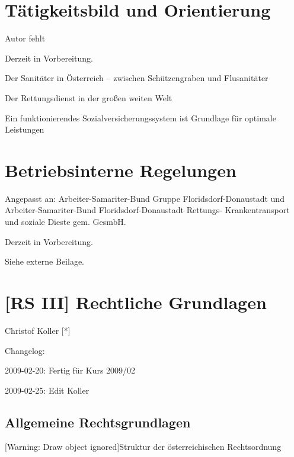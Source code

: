 \documentclass{article}
\begin{document}
\section{T\"atigkeitsbild und Orientierung}
Autor fehlt

Derzeit in Vorbereitung.

Der Sanit\"ater in \"Osterreich -- zwischen Sch\"utzengraben und
Flusanit\"ater

Der Rettungsdienst in der gro{\ss}en weiten Welt 

Ein funktionierendes Sozialversicherungssystem ist Grundlage f\"ur
optimale Leistungen

\section{Betriebsinterne Regelungen}
Angepasst an: Arbeiter-Samariter-Bund Gruppe Floridsdorf-Donaustadt und 
Arbeiter-Samariter-Bund Floridsdorf-Donaustadt Rettungs-
Krankentransport und soziale Dieste gem. GesmbH.

Derzeit in Vorbereitung.

Siehe externe Beilage. 

\section{[RS III] Rechtliche Grundlagen}
Christof Koller [*]

Changelog:

2009-02-20: Fertig f\"ur Kurs 2009/02

2009-02-25: Edit Koller

\setcounter{tocdepth}{10}
\renewcommand\contentsname{\"Ubersicht}
\tableofcontents
\subsection{Allgemeine Rechtsgrundlagen}
[Warning: Draw object ignored]Struktur der \"osterreichischen
Rechtsordnung
\end{document}
